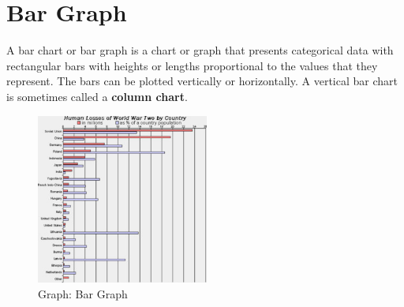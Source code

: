 \section{Bar Graph \cite{wiki-bar-chart}}\label{graph_bar}
A bar chart or bar graph is a chart or graph that presents categorical data with rectangular bars with heights or lengths proportional to the values that they represent. The bars can be plotted vertically or horizontally. A vertical bar chart is sometimes called a \textbf{column chart}.


\begin{center}
    \begin{figure}[H]
        \centering
        \includegraphics[height=5.6cm]{Pictures/data/data_graph_bar.jpg}
        \caption{Graph: Bar Graph}
    \end{figure}
\end{center}
